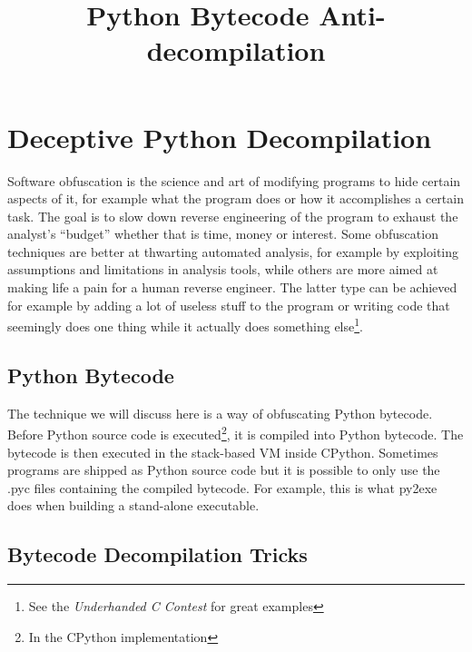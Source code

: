 \documentclass[twocolumn]{article}
\begin{document}
\title{Python Bytecode Anti-decompilation}
\date{}
\section*{Deceptive Python Decompilation}

\vspace*{-0.5\baselineskip}

Software obfuscation is the science and art of modifying programs to hide certain aspects of it, for example what the program does or how it accomplishes a certain task. The goal is to slow down reverse engineering of the program to exhaust the analyst's ``budget'' whether that is time, money or interest. Some obfuscation techniques are better at thwarting automated analysis, for example by exploiting assumptions and limitations in analysis tools, while others are more aimed at making life a pain for a human reverse engineer. The latter type can be achieved for example by adding a lot of useless stuff to the program or writing code that seemingly does one thing while it actually does something else\footnote{See the \textit{Underhanded C Contest} for great examples}.

\vspace*{-1\baselineskip}

\subsection*{Python Bytecode}

\vspace*{-0.3\baselineskip}

The technique we will discuss here is a way of obfuscating Python bytecode. Before Python source code is executed\footnote{In the CPython implementation}, it is compiled into Python bytecode. The bytecode is then executed in the stack-based VM inside CPython. Sometimes programs are shipped as Python source code but it is possible to only use the .pyc files containing the compiled bytecode. For example, this is what py2exe does when building a stand-alone executable.

\vspace*{-1\baselineskip}

\subsection*{Bytecode Decompilation Tricks}
\end{document}
